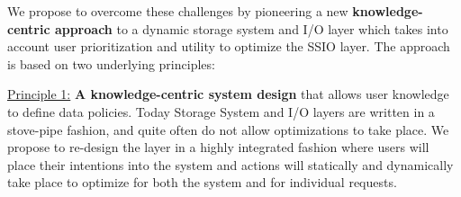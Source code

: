 
%
%
%

We propose to overcome these challenges by pioneering a new {\bf
knowledge-centric approach} to a dynamic storage system and I/O layer which
takes into account user prioritization and utility to optimize the SSIO layer.
The approach is based on two underlying principles:

\underline{Principle 1:} {\bf A knowledge-centric system design} that allows user knowledge  to
define data policies. Today Storage System and I/O layers are written in a
stove-pipe fashion, and quite often do not allow optimizations to take place.
We propose to re-design the layer in a highly integrated fashion where users
will place their intentions into the system and actions will statically and dynamically
take place to optimize for both the system and for individual
requests.

